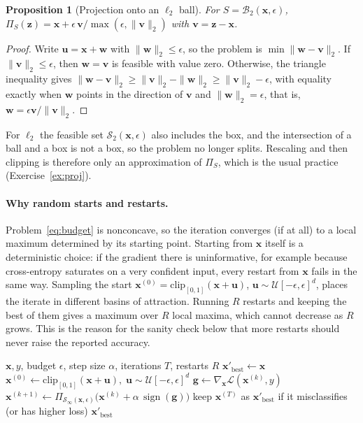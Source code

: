 \documentclass[10pt,a4paper]{extarticle}
\newtheorem{proposition}[theorem]{Proposition}
\theoremstyle{definition}
\newcommand{\Loss}{\mathcal{L}}
\newcommand{\x}{\mathbf{x}}
\newcommand{\xadv}{\mathbf{x}'}
\newcommand{\B}{\mathcal{B}}
\newcommand{\Proj}{\Pi}
\DeclareMathOperator{\sign}{sign}
\begin{document}
\begin{proposition}[Projection onto an \(\ell_2\) ball]\label{prop:proj2}
For \(S=\B_2(\x,\epsilon)\), \(\Proj_S(\mathbf{z})=\x+\epsilon\,\mathbf{v}/\max(\epsilon,\|\mathbf{v}\|_2)\) with \(\mathbf{v}=\mathbf{z}-\x\).
\end{proposition}

\begin{proof}
Write \(\mathbf{u}=\x+\mathbf{w}\) with \(\|\mathbf{w}\|_2\le\epsilon\), so the problem is \(\min\|\mathbf{w}-\mathbf{v}\|_2\). If \(\|\mathbf{v}\|_2\le\epsilon\), then \(\mathbf{w}=\mathbf{v}\) is feasible with value zero. Otherwise, the triangle inequality gives \(\|\mathbf{w}-\mathbf{v}\|_2\ge\|\mathbf{v}\|_2-\|\mathbf{w}\|_2\ge\|\mathbf{v}\|_2-\epsilon\), with equality exactly when \(\mathbf{w}\) points in the direction of \(\mathbf{v}\) and \(\|\mathbf{w}\|_2=\epsilon\), that is, \(\mathbf{w}=\epsilon\mathbf{v}/\|\mathbf{v}\|_2\).
\end{proof}

For \(\ell_2\) the feasible set \(\mathcal{S}_2(\x,\epsilon)\) also includes the box, and the intersection of a ball and a box is not a box, so the problem no longer splits. Rescaling and then clipping is therefore only an approximation of \(\Proj_S\), which is the usual practice (Exercise~\ref{ex:proj}).

\paragraph{Why random starts and restarts.} Problem~\eqref{eq:budget} is nonconcave, so the iteration converges (if at all) to a local maximum determined by its starting point. Starting from \(\x\) itself is a deterministic choice: if the gradient there is uninformative, for example because cross-entropy saturates on a very confident input, every restart from \(\x\) fails in the same way. Sampling the start \(\x^{(0)}=\mathrm{clip}_{[0,1]}(\x+\mathbf{u})\), \(\mathbf{u}\sim\mathcal{U}[-\epsilon,\epsilon]^d\), places the iterate in different basins of attraction. Running \(R\) restarts and keeping the best of them gives a maximum over \(R\) local maxima, which cannot decrease as \(R\) grows. This is the reason for the sanity check below that more restarts should never raise the reported accuracy.

\begin{algorithm}[h]
\caption{PGD attack, \(\ell_\infty\), untargeted}
\begin{algorithmic}[1]
\Require \(\x, y\), budget \(\epsilon\), step size \(\alpha\), iterations \(T\), restarts \(R\)
\State \(\xadv_{\text{best}} \gets \x\)
  \State \(\x^{(0)} \gets \mathrm{clip}_{[0,1]}(\x + \mathbf{u}),\; \mathbf{u}\sim\mathcal{U}[-\epsilon,\epsilon]^d\)
    \State \(\mathbf{g} \gets \nabla_{\x}\Loss(\x^{(k)},y)\)
    \State \(\x^{(k+1)} \gets \Proj_{\mathcal{S}_\infty(\x,\epsilon)}\big(\x^{(k)}+\alpha\,\sign(\mathbf{g})\big)\)
  \EndFor
  \State keep \(\x^{(T)}\) as \(\xadv_{\text{best}}\) if it misclassifies (or has higher loss)
\EndFor
\State \Return \(\xadv_{\text{best}}\)
\end{algorithmic}
\end{algorithm}
\end{document}
